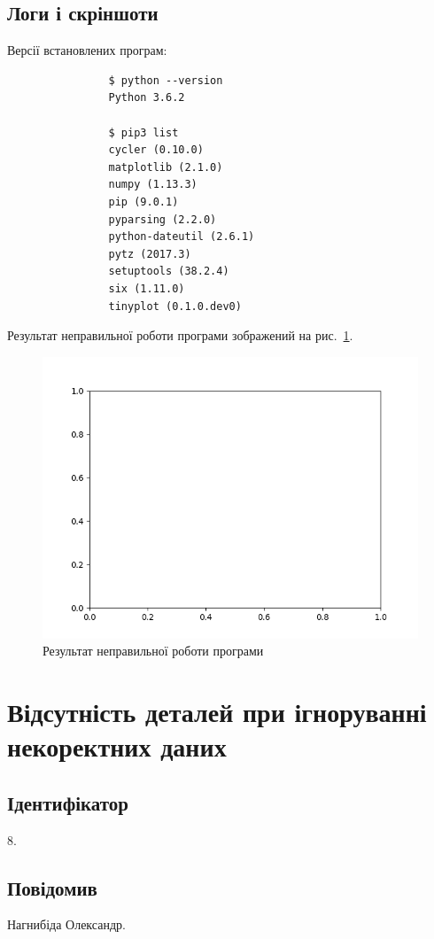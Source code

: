 \documentclass[a4paper,oneside,DIV=12,12pt]{scrartcl}
\begin{document}
		\subsection{Логи і скріншоти}
			Версії встановлених програм:
			\begin{lstlisting}
				$ python --version
				Python 3.6.2

				$ pip3 list
				cycler (0.10.0)
				matplotlib (2.1.0)
				numpy (1.13.3)
				pip (9.0.1)
				pyparsing (2.2.0)
				python-dateutil (2.6.1)
				pytz (2017.3)
				setuptools (38.2.4)
				six (1.11.0)
				tinyplot (0.1.0.dev0)
			\end{lstlisting}
			
			Результат неправильної роботи програми зображений на рис.~\ref{fig:issue-007-01}.
			
			\begin{figure}[!htbp]
			\centering
				\includegraphics[height = 9\baselineskip]{assets/issue-007-01.png}
			\caption{Результат неправильної роботи програми}
			\label{fig:issue-007-01}
			\end{figure}
			
	\section{Відсутність деталей при ігноруванні некоректних даних}
		\subsection{Ідентифікатор}
			8.
			
		\subsection{Повідомив}
			Нагнибіда Олександр.
			
\end{document}
